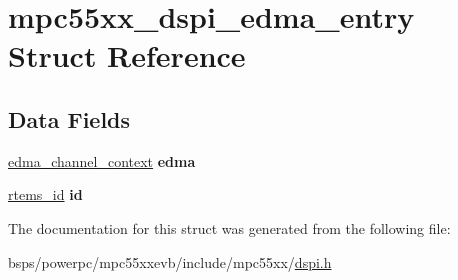 \hypertarget{structmpc55xx__dspi__edma__entry}{}\section{mpc55xx\+\_\+dspi\+\_\+edma\+\_\+entry Struct Reference}
\label{structmpc55xx__dspi__edma__entry}
\subsection*{Data Fields}
\begin{DoxyCompactItemize}
\item 
\mbox{\label{structmpc55xx__dspi__edma__entry_aa2e01b7ffa185df3f89ac46f99745f65}} 
\mbox{\hyperlink{structedma__channel__context}{edma\+\_\+channel\+\_\+context}} {\bfseries edma}
\item 
\mbox{\label{structmpc55xx__dspi__edma__entry_a6528a34ed7ac338069a26981ada26eeb}} 
\mbox{\hyperlink{group__ClassicTasks_gab20892b814dced7dd4e5b9bf42becd57}{rtems\+\_\+id}} {\bfseries id}
\end{DoxyCompactItemize}


The documentation for this struct was generated from the following file\+:\begin{DoxyCompactItemize}
\item 
bsps/powerpc/mpc55xxevb/include/mpc55xx/\mbox{\hyperlink{dspi_8h}{dspi.\+h}}\end{DoxyCompactItemize}
